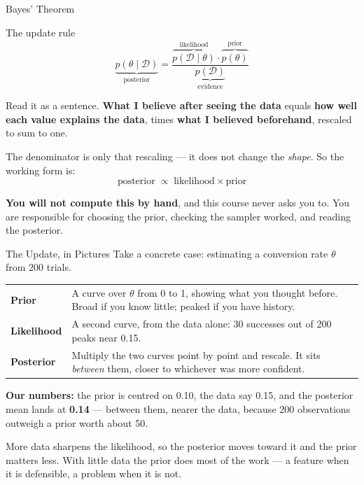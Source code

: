 \documentclass[aspectratio=169, 11pt]{beamer}
\begin{document}
\begin{frame}{Bayes' Theorem \parencite{Gelman2013}}
  \begin{definitionbox}{The update rule}
    \[
      \underbrace{p(\theta \mid \mathcal{D})}_{\text{posterior}}
      = \frac{\overbrace{p(\mathcal{D} \mid \theta)}^{\text{likelihood}}
              \cdot \overbrace{p(\theta)}^{\text{prior}}}
             {\underbrace{p(\mathcal{D})}_{\text{evidence}}}
    \]
  \end{definitionbox}

  Read it as a sentence. \textbf{What I believe after seeing the data} equals \textbf{how well
  each value explains the data}, times \textbf{what I believed beforehand}, rescaled to sum to one.

  \vspace{0.1cm}
  The denominator is only that rescaling --- it does not change the \emph{shape}. So the working
  form is:
  \[
    \text{posterior} \;\propto\; \text{likelihood} \times \text{prior}
  \]
  \vspace{-0.3cm}

  \textbf{You will not compute this by hand}, and this course never asks you to. You are
  responsible for choosing the prior, checking the sampler worked, and reading the posterior.
\end{frame}

\begin{frame}{The Update, in Pictures}
  Take a concrete case: estimating a conversion rate $\theta$ from 200 trials.

  \vspace{0.1cm}
  \begin{center}
    {\small
    \begin{tabular}{p{2.6cm}p{9.9cm}}
      \toprule
      \textbf{Prior} & A curve over $\theta$ from 0 to 1, showing what you thought before. Broad
      if you know little; peaked if you have history. \\[3pt]
      \textbf{Likelihood} & A second curve, from the data alone: 30 successes out of 200 peaks
      near 0.15. \\[3pt]
      \textbf{Posterior} & Multiply the two curves point by point and rescale. It sits
      \emph{between} them, closer to whichever was more confident. \\
      \bottomrule
    \end{tabular}
    }
  \end{center}

  \textbf{Our numbers:} the prior is centred on 0.10, the data say 0.15, and the posterior mean
  lands at \textbf{0.14} --- between them, nearer the data, because 200 observations outweigh a
  prior worth about 50.

  \vspace{0.1cm}
  More data sharpens the likelihood, so the posterior moves toward it and the prior matters less.
  With little data the prior does most of the work --- a feature when it is defensible, a problem
  when it is not.
\end{frame}
\end{document}
